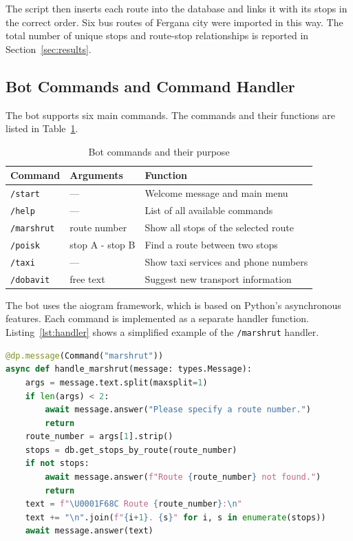 The script then inserts each route into the database and links it with its
stops in the correct order. Six bus routes of Fergana city were imported in
this way. The total number of unique stops and route-stop relationships is
reported in Section~\ref{sec:results}.

\subsection{Bot Commands and Command Handler}
\label{subsec:commands}

The bot supports six main commands. The commands and their functions are
listed in Table~\ref{tab:commands}.

\begin{table}[h]
\centering
\caption{Bot commands and their purpose}
\label{tab:commands}
\begin{tabular}{lll}
\hline
\textbf{Command} & \textbf{Arguments} & \textbf{Function} \\
\hline
\texttt{/start} & --- & Welcome message and main menu \\
\texttt{/help} & --- & List of all available commands \\
\texttt{/marshrut} & route number & Show all stops of the selected route \\
\texttt{/poisk} & stop A - stop B & Find a route between two stops \\
\texttt{/taxi} & --- & Show taxi services and phone numbers \\
\texttt{/dobavit} & free text & Suggest new transport information \\
\hline
\end{tabular}
\end{table}

The bot uses the aiogram framework, which is based on Python's asynchronous
features. Each command is implemented as a separate handler function.
Listing~\ref{lst:handler} shows a simplified example of the
\texttt{/marshrut} handler.

\begin{lstlisting}[language=Python, caption={Example handler for the
    /marshrut command}, label={lst:handler}]
@dp.message(Command("marshrut"))
async def handle_marshrut(message: types.Message):
    args = message.text.split(maxsplit=1)
    if len(args) < 2:
        await message.answer("Please specify a route number.")
        return
    route_number = args[1].strip()
    stops = db.get_stops_by_route(route_number)
    if not stops:
        await message.answer(f"Route {route_number} not found.")
        return
    text = f"\U0001F68C Route {route_number}:\n"
    text += "\n".join(f"{i+1}. {s}" for i, s in enumerate(stops))
    await message.answer(text)
\end{lstlisting}


